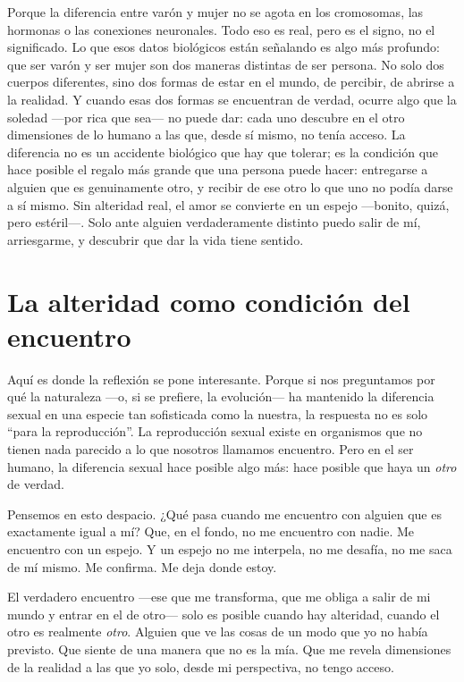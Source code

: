 Porque la diferencia entre varón y mujer no se agota en los cromosomas, las hormonas o las conexiones neuronales. Todo eso es real, pero es el signo, no el significado. Lo que esos datos biológicos están señalando es algo más profundo: que ser varón y ser mujer son dos maneras distintas de ser persona. No solo dos cuerpos diferentes, sino dos formas de estar en el mundo, de percibir, de abrirse a la realidad. Y cuando esas dos formas se encuentran de verdad, ocurre algo que la soledad ---por rica que sea--- no puede dar: cada uno descubre en el otro dimensiones de lo humano a las que, desde sí mismo, no tenía acceso. La diferencia no es un accidente biológico que hay que tolerar; es la condición que hace posible el regalo más grande que una persona puede hacer: entregarse a alguien que es genuinamente otro, y recibir de ese otro lo que uno no podía darse a sí mismo. Sin alteridad real, el amor se convierte en un espejo ---bonito, quizá, pero estéril---. Solo ante alguien verdaderamente distinto puedo salir de mí, arriesgarme, y descubrir que dar la vida tiene sentido.

\section{La alteridad como condición del encuentro}

Aquí es donde la reflexión se pone interesante. Porque si nos preguntamos por qué la naturaleza ---o, si se prefiere, la evolución--- ha mantenido la diferencia sexual en una especie tan sofisticada como la nuestra, la respuesta no es solo ``para la reproducción''. La reproducción sexual existe en organismos que no tienen nada parecido a lo que nosotros llamamos encuentro. Pero en el ser humano, la diferencia sexual hace posible algo más: hace posible que haya un \textit{otro} de verdad.

Pensemos en esto despacio. ¿Qué pasa cuando me encuentro con alguien que es exactamente igual a mí? Que, en el fondo, no me encuentro con nadie. Me encuentro con un espejo. Y un espejo no me interpela, no me desafía, no me saca de mí mismo. Me confirma. Me deja donde estoy.

El verdadero encuentro ---ese que me transforma, que me obliga a salir de mi mundo y entrar en el de otro--- solo es posible cuando hay alteridad, cuando el otro es realmente \textit{otro}. Alguien que ve las cosas de un modo que yo no había previsto. Que siente de una manera que no es la mía. Que me revela dimensiones de la realidad a las que yo solo, desde mi perspectiva, no tengo acceso.

